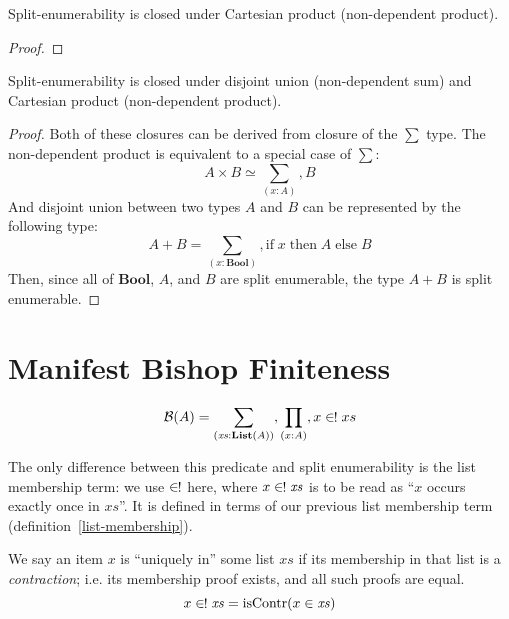\begin{rm-lemma}
  Split-enumerability is closed under Cartesian product (non-dependent product).
\end{rm-lemma} 
\begin{proof}
\end{proof}
\begin{rm-lemma}
  Split-enumerability is closed under disjoint union (non-dependent sum) and
  Cartesian product (non-dependent product).
\end{rm-lemma}
\begin{proof}
  Both of these closures can be derived from closure of the \(\sum\) type.
  The non-dependent product is equivalent to a special case of \(\sum\):
  \begin{equation}
    A \times B \simeq \sum_{(x : A)} , B
  \end{equation}
  And disjoint union between two types \(A\) and \(B\) can be represented by the
  following type:
  \begin{equation}
    A + B = \sum_{(x : \mathbf{Bool})} , \text{if} \; x \; \text{then} \; A \; \text{else} \; B
  \end{equation}
  Then, since all of \(\mathbf{Bool}\), \(A\), and \(B\) are split enumerable,
  the type \(A + B\) is split enumerable.
\end{proof}
\section{Manifest Bishop Finiteness} \label{manifest-bishop}
\begin{rm-definition}
  \begin{equation}
    \mathcal{B}(A) = \sum_{(\mathit{xs} : \textbf{List}(A))} , \prod_{(x : A)} , x \inunique xs
  \end{equation}
\end{rm-definition}
The only difference between this predicate and split enumerability is the list
membership term: we use \(\inunique\) here, where \(x \inunique \mathit{xs}\) is
to be read as ``\(x\) occurs exactly once in \(\mathit{xs}\)''.
It is defined in terms of our previous list membership term
(definition~\ref{list-membership}).
\begin{rm-definition}
  We say an item \(x\) is ``uniquely in'' some list \(\mathit{xs}\) if its
  membership in that list is a \emph{contraction}; i.e. its membership proof
  exists, and all such proofs are equal.
  \begin{equation}
    x \inunique \mathit{xs} = \text{isContr}(x \in \mathit{xs})
  \end{equation}
\end{rm-definition}

